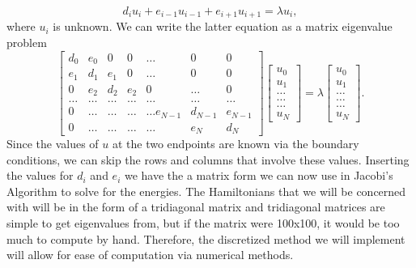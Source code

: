 \documentclass{article}
\begin{document}
\begin{equation*}
d_iu_i+e_{i-1}u_{i-1}+e_{i+1}u_{i+1}  = \lambda u_i,
\end{equation*}
where $u_i$ is unknown. We can write the 
latter equation as a matrix eigenvalue problem
\begin{equation}
    \begin{bmatrix}d_0 & e_0 & 0   & 0    & \dots  &0     & 0 \\
                                e_1 & d_1 & e_1 & 0    & \dots  &0     &0 \\
                                0   & e_2 & d_2 & e_2  &0       &\dots & 0\\
                                \dots  & \dots & \dots & \dots  &\dots      &\dots & \dots\\
                                0   & \dots & \dots & \dots  &\dots  e_{N-1}     &d_{N-1} & e_{N-1}\\
                                0   & \dots & \dots & \dots  &\dots       &e_{N} & d_{N}
             \end{bmatrix}  \begin{bmatrix} u_{0} \\
                                                              u_{1} \\
                                                              \dots\\ \dots\\ \dots\\
                                                              u_{N}
             \end{bmatrix}=\lambda \begin{bmatrix} u_{0} \\
                                                              u_{1} \\
                                                              \dots\\ \dots\\ \dots\\
                                                              u_{N}
             \end{bmatrix}.  
      \label{eq:sematrix}
\end{equation}
Since the values of $u$ at the two endpoints are known via the boundary conditions, we can skip the rows and columns that involve these values. Inserting the values for $d_i$ and $e_i$ we have the a matrix form we can now use in Jacobi's Algorithm to solve for the energies. \cite{mortengithub}
The Hamiltonians that we will be concerned with will be in the form of a tridiagonal matrix and tridiagonal matrices are simple to get eigenvalues from, but if the matrix were 100x100, it would be too much to compute by hand. Therefore, the discretized method we will implement will allow for ease of computation via numerical methods.
\end{document}
